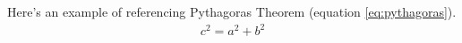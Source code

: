 \documentclass[12pt]{article}
\begin{document}
Here's an example of referencing Pythagoras Theorem (equation \ref{eq:pythagoras}).
\begin{align} \label{eq:pythagoras}
	c^2 = a^2 + b^2
\end{align}





\printbibliography
\end{document}
